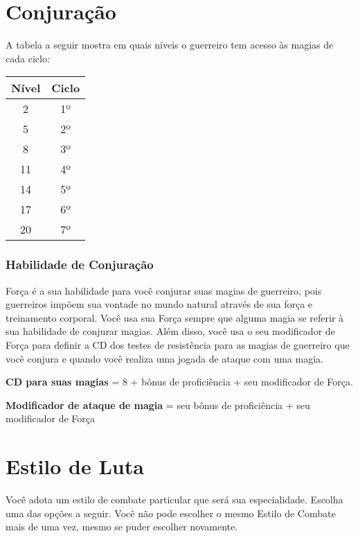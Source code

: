 \begin{multicols}{2}
\section*{Conjuração}%

A tabela a seguir mostra em quais níveis o guerreiro tem acesso às magias de
cada ciclo:

\begin{center}
\begin{tabular}{|||c||c|||}
    \hline
    \textbf{Nível} & \textbf{Ciclo} \\
    \hline
    2 & 1º \\
    \hline
    5 & 2º \\
    \hline
    8 & 3º \\
    \hline
    11 & 4º \\
    \hline
    14 & 5º \\
    \hline
    17 & 6º \\
    \hline
    20 & 7º \\
    \hline
\end{tabular}
\end{center}

\subsubsection*{Habilidade de Conjuração}%

Força é a sua habilidade para você conjurar suas magias de guerreiro, pois
guerreiros impõem sua vontade no mundo natural através de sua força e
treinamento corporal. Você usa sua Força sempre que alguma magia se referir à
sua habilidade de conjurar magias. Além disso, você usa o seu modificador de
Força para definir a CD dos testes de resistência para as magias de guerreiro
que você conjura e quando você realiza uma jogada de ataque com uma magia.

\begin{center}
\textbf{CD para suas magias} = 8 + bônus de proficiência + seu modificador de
Força. \nl

\textbf{Modificador de ataque de magia} = seu bônus de proficiência + seu
modificador de Força
\end{center}

\section*{Estilo de Luta}%

Você adota um estilo de combate particular que será sua especialidade. Escolha
uma das opções a seguir. Você não pode escolher o mesmo Estilo de Combate mais
de uma vez, mesmo se puder escolher novamente.


\end{multicols}
